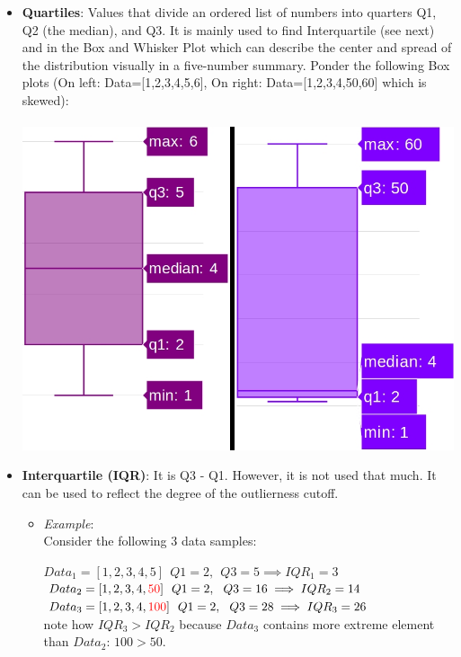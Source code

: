 \documentclass[11pt, twocolumn]{article}
\begin{document}
\begin{itemize}
\item \textbf{Quartiles}: Values that divide an ordered list of numbers into quarters Q1, Q2 (the median), and Q3. It is mainly used to find Interquartile (see next) and in the Box and Whisker Plot which can describe the center and {\color{blue} spread} of the distribution visually in a five-number summary. Ponder the following Box plots (On left: Data=[1,2,3,4,5,6], On right: Data=[1,2,3,4,50,60] which is skewed):\\\\
\includegraphics[width=\linewidth,keepaspectratio]{figs/quartiles.jpeg}
\end{itemize}

\begin{itemize}
\item \textbf{Interquartile (IQR)}: It is Q3 - Q1. However, it is not used that much. It can be used to reflect the degree of the outlierness cutoff.
\begin{itemize}
\item \textit{Example}:\\ 
Consider the following 3 data samples:

$Data_1 = [1,2,3,4,5] ~~ Q1=2, ~~ Q3=5 \implies IQR_1 = 3$  \\
$Data_2 = [1,2,3,4,{\color{red} 50}] ~~ Q1=2, ~~ Q3=16 \implies IQR_2 = 14$  \\
$Data_3 = [1,2,3,4,{\color{red} 100}] ~~ Q1=2, ~~ Q3=28 \implies IQR_3 = 26$  \\
note how $IQR_3 > IQR_2$ because $Data_3$ contains more extreme element than $Data_2$: $100 > 50$.
\end{itemize}
\end{itemize}
\end{document}
